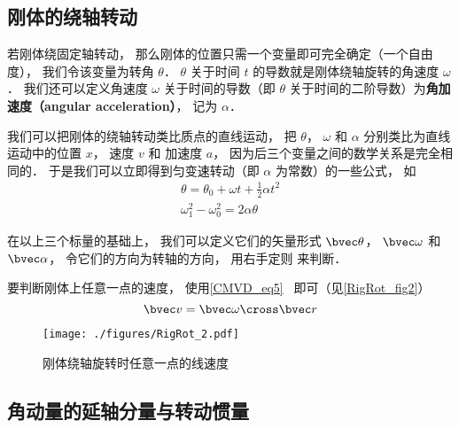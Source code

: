 

\subsection{刚体的绕轴转动}
若刚体绕固定轴转动， 那么刚体的位置只需一个变量即可完全确定（一个自由度）， 我们令该变量为转角 $\theta$． $\theta$ 关于时间 $t$ 的导数就是刚体绕轴旋转的角速度 $\omega$． 我们还可以定义角速度 $\omega$ 关于时间的导数（即 $\theta$ 关于时间的二阶导数）为\textbf{角加速度（angular acceleration）}， 记为 $\alpha$．

我们可以把刚体的绕轴转动类比质点的直线运动， 把 $\theta$， $\omega$ 和 $\alpha$ 分别类比为直线运动中的位置 $x$， 速度 $v$ 和 加速度 $a$， 因为后三个变量之间的数学关系是完全相同的． 于是我们可以立即得到匀变速转动（即 $\alpha$ 为常数）的一些公式， 如
\begin{gather}
\theta = \theta_0 + \omega t + \frac12 \alpha t^2\\
\omega_1^2 - \omega_0^2 = 2\alpha \theta
\end{gather}

在以上三个标量的基础上， 我们可以定义它们的矢量形式 $\bvec \theta$， $\bvec \omega$ 和 $\bvec \alpha$， 令它们的方向为转轴的方向， 用右手定则 来判断．

要判断刚体上任意一点的速度， 使用\autoref{CMVD_eq5}~ 即可（见\autoref{RigRot_fig2}）
\begin{equation}
\bvec v = \bvec \omega \cross \bvec r
\end{equation}

\begin{figure}[ht]
\centering
\texttt{[image: ./figures/RigRot\_2.pdf]}
\caption{刚体绕轴旋转时任意一点的线速度} \label{RigRot_fig2}
\end{figure}

\subsection{角动量的延轴分量与转动惯量}

